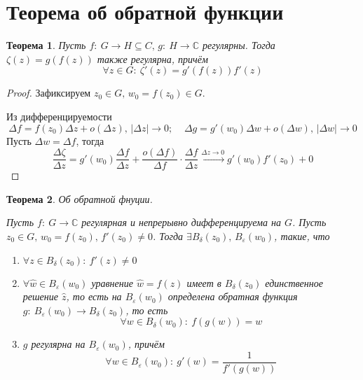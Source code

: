 \documentclass[a4paper,12pt]{article}
\theoremstyle{plain}
\newtheorem{theorem}{Теорема}[section]
\theoremstyle{definition}
\theoremstyle{remark}
\begin{document}
\section{Теорема об обратной функции}
\begin{theorem}
	Пусть $f :\: G \to H \subseteq C,\, g :\: H \to \mathbb{C}$ регулярны. Тогда $\zeta(z) = g(f(z))$ также регулярна, причём
	\[
		\forall z \in G :\: \zeta'(z) = g'(f(z))f'(z)
	\]
\end{theorem}

\begin{proof}
	Зафиксируем $z_0 \in G,\, w_0 = f(z_0) \in G$.

	Из дифференцируемости
	\[
		\Delta f = f(z_0)\Delta z + o(\Delta z),\, \vert\Delta z\vert \to 0;\;\;\;\; \Delta g = g'(w_0)\Delta w + o(\Delta w),\, \vert\Delta w\vert \to 0
	\]
	Пусть $\Delta w = \Delta f$, тогда
	\[
		\frac{\Delta\zeta}{\Delta z} = g'(w_0)\frac{\Delta f}{\Delta z} + \frac{o(\Delta f)}{\Delta f}\cdot\frac{\Delta f}{\Delta z} \overset{\Delta z \to 0}{\to} g'(w_0)f'(z_0) + 0
	\]
\end{proof}

\begin{theorem}
	Об обратной фнуции.

	Пусть $f :\: G \to \mathbb{C}$ регулярная и непрерывно дифференцируема на $G$. Пусть $z_0 \in G,\, w_0 = f(z_0),\, f'(z_0) \neq 0$. Тогда $\exists B_\delta(z_0),\, B_\varepsilon(w_0)$, такие, что
	\begin{enumerate}
		\item $\forall z \in B_\delta(z_0) :\: f'(z) \neq 0$
		\item $\forall \hat{w} \in B_\varepsilon(w_0)$ уравнение $\hat{w} = f(z)$ имеет в $B_\delta(z_0)$ единственное решение $\hat{z}$, то есть на $B_\varepsilon(w_0)$ определена обратная функция $g :\: B_\varepsilon(w_0) \to B_\delta(z_0)$, то есть
		      \[
			      \forall w \in B_\delta(w_0) :\: f(g(w)) = w
		      \]
		\item $g$ регулярна на $B_\varepsilon(w_0)$, причём
		      \[
			      \forall w \in B_\varepsilon(w_0) :\: g'(w) = \frac{1}{f'(g(w))}
		      \]
	\end{enumerate}
\end{theorem}
\end{document}
